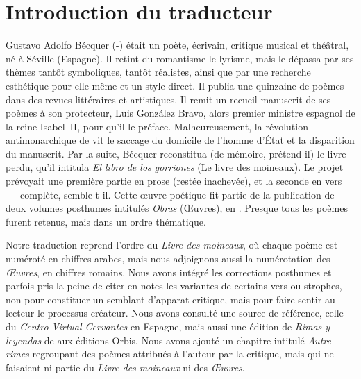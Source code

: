 \documentclass[a4paper,12pt]{book}
\begin{document}
\chapter{Introduction du traducteur}

Gustavo Adolfo Bécquer (-) était
un poète, écrivain, critique musical et théâtral, né à Séville
(Espagne). Il retint du romantisme le lyrisme, mais le dépassa par ses
thèmes tantôt symboliques, tantôt réalistes, ainsi que par une
recherche esthétique pour elle-même et un style direct. Il publia une
quinzaine de poèmes dans des revues littéraires et artistiques. Il
remit un recueil manuscrit de ses poèmes à son protecteur, Luis
González Bravo, alors premier ministre espagnol de la reine Isabel~II,
pour qu'il le préface. Malheureusement, la révolution antimonarchique
de  vit le saccage du domicile de l'homme d'État et
la disparition du manuscrit. Par la suite, Bécquer reconstitua (de
mémoire, prétend-il) le livre perdu, qu'il intitula \emph{El libro de
los gorriones} (Le livre des moineaux). Le projet prévoyait une
première partie en prose (restée inachevée), et la seconde en vers
---~complète, semble-t-il. Cette œuvre poétique fit partie de la
publication de deux volumes posthumes intitulés \emph{Obras} (Œuvres),
en . Presque tous les poèmes furent retenus, mais
dans un ordre thématique.

Notre traduction reprend l'ordre du \emph{Livre des moineaux}, où
chaque poème est numéroté en chiffres arabes, mais nous adjoignons
aussi la numérotation des \emph{Œuvres}, en chiffres romains. Nous
avons intégré les corrections posthumes et parfois pris la peine de
citer en notes les variantes de certains vers ou strophes, non pour
constituer un semblant d'apparat critique, mais pour faire sentir au
lecteur le processus créateur. Nous avons consulté une source de
référence, celle du \emph{Centro Virtual Cervantes} en Espagne, mais
aussi une édition de \emph{Rimas y leyendas} de 
aux éditions Orbis. Nous avons ajouté un chapitre intitulé \emph{Autre
rimes} regroupant des poèmes attribués à l'auteur par la critique,
mais qui ne faisaient ni partie du \emph{Livre des moineaux} ni des
\emph{Œuvres}.
\end{document}
